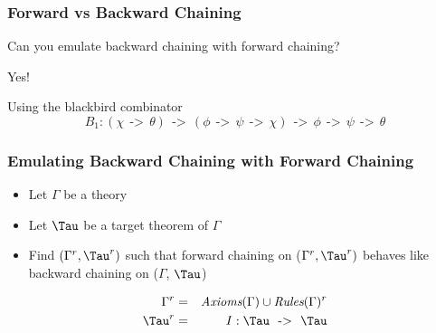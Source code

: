 \documentclass[aspectratio=169]{beamer}
\newcommand{\arrowtype}{\ \ \text{->}\ \ }
\newcommand{\blackbird}{B_1}
\newcommand{\idiot}{I}
\newcommand{\av}{\phi}
\newcommand{\bv}{\psi}
\newcommand{\cv}{\chi}
\newcommand{\dv}{\theta}
\begin{document}
\begin{frame}
  \frametitle{Forward vs Backward Chaining}

  \begin{center}
    Can you emulate backward chaining with forward chaining?

    \pause

    \vspace{1cm}

    {\color{red}Yes!}

    \vspace{0.5cm}

    Using the {\color{red}blackbird} combinator
    $$\blackbird : (\cv \arrowtype \dv) \arrowtype (\av \arrowtype \bv \arrowtype \cv) \arrowtype \av \arrowtype \bv \arrowtype \dv$$
  \end{center}
\end{frame}

\begin{frame}
  \frametitle{Emulating Backward Chaining with Forward Chaining}

  \begin{itemize}
  \item Let $\Gamma$ be a theory
  \item Let $\Tau$ be a target theorem of $\Gamma$
  \item Find $(\Gamma^r, \Tau^r)$ such that forward chaining on
    ($\Gamma^r, \Tau^r)$ behaves like backward chaining on
    ($\Gamma$, $\Tau$)
  \end{itemize}

  \pause

  \begin{eqnarray*}
    \Gamma^r &=& \textit{Axioms}(\Gamma) \cup
                    \textit{Rules}(\Gamma)^r \\
    \Tau^r &=& \idiot : \Tau \arrowtype \Tau
  \end{eqnarray*}
\end{frame}
\end{document}
